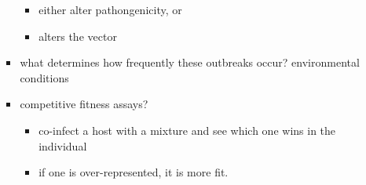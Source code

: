 \documentclass{article}
\begin{document}
\begin{itemize}
\begin{itemize}
\begin{itemize}
\begin{itemize}
                    \item either alter pathongenicity, or
                    \item alters the vector
                \end{itemize}
                \item what determines how frequently these outbreaks occur? environmental conditions
                \item competitive fitness assays?
                \begin{itemize}
                    \item co-infect a host with a mixture and see which one wins in the individual
                    \item if one is over-represented, it is more fit.
                \end{itemize}
            \end{itemize}
        \end{itemize}
    \end{itemize}
\end{document}
